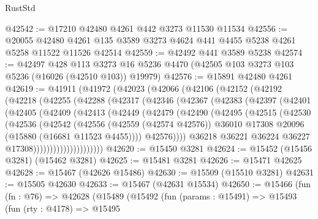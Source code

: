 \begin{lexlean}{RustStd}
\begin{coremodule}
@42542 := @17210 @42480 @4261 @442 @3273 @11530 @11534
@42556 := @20055
    @42480
    @4261
    @135
    @3589
    @3273
    @4624
    @441
    @4455
    @5238
    @4261
    @5258
    @11522
    @11526
    @42514
@42559 := @42492 @441 @3589 @5238
@42574 := @42497
    @428
    @113
    @3273
    @16
    @5236
    @4470
    (@42505 @103 @3273 @103 @5236 (@16026 (@42510 @103)) @19979)
@42576 := @15891 @42480 @4261
@42619 := @41911
    (@41972
      (@42023
        (@42066
          (@42106
            (@42152
              (@42192
                (@42218
                  (@42255
                    (@42288
                      (@42317
                        (@42346
                          (@42367
                            (@42383
                              (@42397
                                (@42401
                                  (@42405
                                    (@42409
                                      (@42413
                                        (@42449
                                          (@42479
                                            (@42490
                                              (@42495
                                                (@42515
                                                  (@42530
                                                    (@42536
                                                      (@42542
                                                        (@42556
                                                          (@42559 (@42574 @42576))
                                                          @36010
                                                          @17308
                                                          @20096
                                                          (@15880 (@16681 @11523 @4455))))
                                                      @42576))))
                                              @36218
                                              @36221
                                              @36224
                                              @36227
                                              @17308)))))))))))))))))))))
@42620 := @15450 @3281
@42624 := @15452 (@15456 @3281) (@15462 @3281)
@42625 := @15481 @3281
@42626 := @15471 @42625
@42628 := @15467 (@42626 @15486)
@42630 := @15509 (@15510 @3281)
@42631 := @15505 @42630
@42633 := @15467 (@42631 @15534)
@42650 := @15466
    (fun (fn : @76) =>
    @42628
      (@15489
        (@15492
          (fun (params : @15491) =>
          @15493
            (fun (rty : @4178) =>
            @15495

\end{coremodule}
\end{lexlean}
